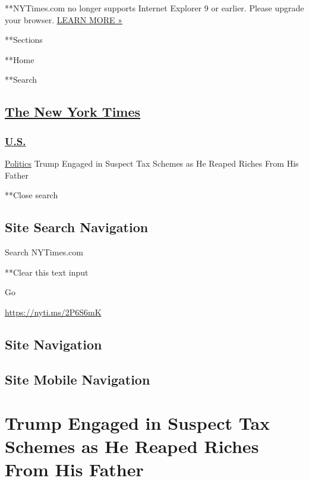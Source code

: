  **NYTimes.com no longer supports Internet Explorer 9 or earlier. Please
upgrade your browser.
\href{http://www.nytimes3xbfgragh.onion/content/help/site/ie9-support.html}{LEARN
MORE »}

**Sections

**Home

**Search

\hypertarget{the-new-york-times}{%
\subsection{\texorpdfstring{\href{http://www.nytimes3xbfgragh.onion/}{The
New York Times}}{The New York Times}}\label{the-new-york-times}}

\hypertarget{-us-}{%
\subsubsection{\texorpdfstring{
\href{https://www.nytimes3xbfgragh.onion/section/us}{U.S.}
}{ U.S. }}\label{-us-}}

 \href{/section/politics}{Politics} \textbar{}Trump Engaged in Suspect
Tax Schemes as He Reaped Riches From His Father

**Close search

\hypertarget{site-search-navigation}{%
\subsection{Site Search Navigation}\label{site-search-navigation}}

Search NYTimes.com

**Clear this text input

Go

\url{https://nyti.ms/2P6S6mK}

\hypertarget{site-navigation}{%
\subsection{Site Navigation}\label{site-navigation}}

\hypertarget{site-mobile-navigation}{%
\subsection{Site Mobile Navigation}\label{site-mobile-navigation}}

\hypertarget{trump-engaged-in-suspect-tax-schemes-as-he-reaped-riches-from-his-father}{%
\section{Trump Engaged in Suspect Tax Schemes as He Reaped Riches From
His
Father}\label{trump-engaged-in-suspect-tax-schemes-as-he-reaped-riches-from-his-father}}

